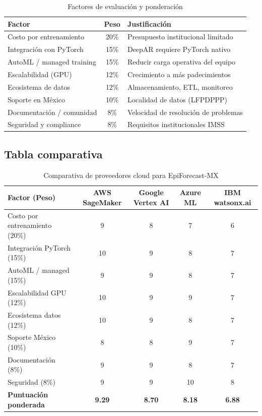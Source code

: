 \documentclass[12pt, letterpaper]{article}
\begin{document}
\begin{table}[H]
\centering
\caption{Factores de evaluación y ponderación}
\label{tab:factores_cloud}
\small
\begin{tabularx}{\textwidth}{l c X}
\toprule
\textbf{Factor} & \textbf{Peso} & \textbf{Justificación} \\
\midrule
Costo por entrenamiento     & 20\% & Presupuesto institucional limitado \\
Integración con PyTorch     & 15\% & DeepAR requiere PyTorch nativo \\
AutoML / managed training   & 15\% & Reducir carga operativa del equipo \\
Escalabilidad (GPU)         & 12\% & Crecimiento a más padecimientos \\
Ecosistema de datos         & 12\% & Almacenamiento, ETL, monitoreo \\
Soporte en México           & 10\% & Localidad de datos (LFPDPPP) \\
Documentación / comunidad   & 8\%  & Velocidad de resolución de problemas \\
Seguridad y compliance      & 8\%  & Requisitos institucionales IMSS \\
\bottomrule
\end{tabularx}
\end{table}

\subsection{Tabla comparativa}

\begin{table}[H]
\centering
\caption{Comparativa de proveedores cloud para EpiForecast-MX}
\label{tab:comparativa_cloud}
\scriptsize
\setlength{\tabcolsep}{3pt}
\begin{tabularx}{\textwidth}{X cccc}
\toprule
\textbf{Factor (Peso)} & \textbf{AWS SageMaker} & \textbf{Google Vertex AI} & \textbf{Azure ML} & \textbf{IBM watsonx.ai} \\
\midrule
Costo por entrenamiento (20\%) & \cellcolor{lightgreen}9 & 8 & 7 & 6 \\
Integración PyTorch (15\%) & \cellcolor{lightgreen}10 & 9 & 8 & 7 \\
AutoML / managed (15\%) & \cellcolor{lightgreen}9 & \cellcolor{lightgreen}9 & 8 & 7 \\
Escalabilidad GPU (12\%) & \cellcolor{lightgreen}10 & 9 & 9 & 7 \\
Ecosistema datos (12\%) & \cellcolor{lightgreen}10 & 9 & 8 & 7 \\
Soporte México (10\%) & 8 & 8 & \cellcolor{lightgreen}9 & 7 \\
Documentación (8\%) & \cellcolor{lightgreen}9 & \cellcolor{lightgreen}9 & 8 & 7 \\
Seguridad (8\%) & 9 & 9 & \cellcolor{lightgreen}10 & 8 \\
\midrule
\textbf{Puntuación ponderada} & \cellcolor{lightgreen}\textbf{9.29} & \textbf{8.70} & \textbf{8.18} & \textbf{6.88} \\
\bottomrule
\end{tabularx}
\end{table}
\end{document}

